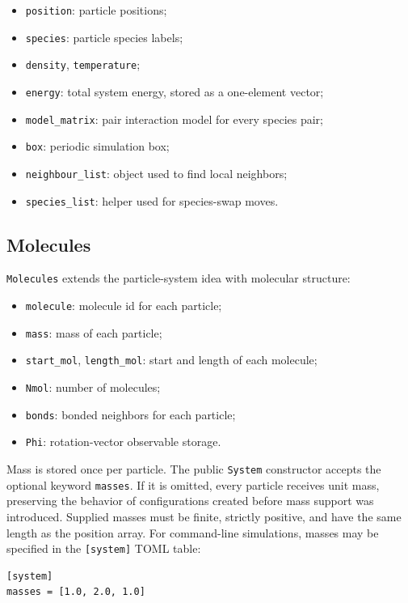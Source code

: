 \documentclass[11pt]{article}
\begin{document}
\begin{itemize}[nosep]
  \item \texttt{position}: particle positions;
  \item \texttt{species}: particle species labels;
  \item \texttt{density}, \texttt{temperature};
  \item \texttt{energy}: total system energy, stored as a one-element vector;
  \item \texttt{model\_matrix}: pair interaction model for every species pair;
  \item \texttt{box}: periodic simulation box;
  \item \texttt{neighbour\_list}: object used to find local neighbors;
  \item \texttt{species\_list}: helper used for species-swap moves.
\end{itemize}

\subsection{Molecules}

\texttt{Molecules} extends the particle-system idea with molecular structure:

\begin{itemize}[nosep]
  \item \texttt{molecule}: molecule id for each particle;
  \item \texttt{mass}: mass of each particle;
  \item \texttt{start\_mol}, \texttt{length\_mol}: start and length of each molecule;
  \item \texttt{Nmol}: number of molecules;
  \item \texttt{bonds}: bonded neighbors for each particle;
  \item \texttt{Phi}: rotation-vector observable storage.
\end{itemize}

Mass is stored once per particle. The public \texttt{System} constructor accepts
the optional keyword \texttt{masses}. If it is omitted, every particle receives
unit mass, preserving the behavior of configurations created before mass support
was introduced. Supplied masses must be finite, strictly positive, and have the
same length as the position array. For command-line simulations, masses may be
specified in the \texttt{[system]} TOML table:

\begin{lstlisting}
[system]
masses = [1.0, 2.0, 1.0]
\end{lstlisting}
\end{document}
